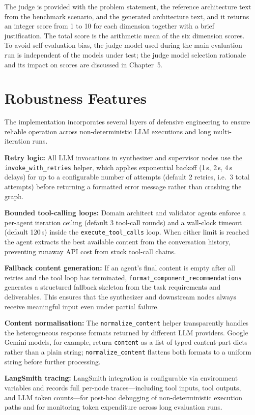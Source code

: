 The judge is provided with the problem statement, the reference architecture text from the benchmark scenario, and the generated architecture text, and it returns an integer score from 1 to 10 for each dimension together with a brief justification. The total score is the arithmetic mean of the six dimension scores. To avoid self-evaluation bias, the judge model used during the main evaluation run is independent of the models under test; the judge model selection rationale and its impact on scores are discussed in Chapter~5.

\section{Robustness Features}

The implementation incorporates several layers of defensive engineering to ensure reliable operation across non-deterministic LLM executions and long multi-iteration runs.

\textbf{Retry logic:} All LLM invocations in synthesizer and supervisor nodes use the \texttt{invoke\_with\_retries} helper, which applies exponential backoff (1\,s, 2\,s, 4\,s delays) for up to a configurable number of attempts (default 2 retries, i.e.\ 3 total attempts) before returning a formatted error message rather than crashing the graph.

\textbf{Bounded tool-calling loops:} Domain architect and validator agents enforce a per-agent iteration ceiling (default 3 tool-call rounds) and a wall-clock timeout (default 120\,s) inside the \texttt{execute\_tool\_calls} loop. When either limit is reached the agent extracts the best available content from the conversation history, preventing runaway API cost from stuck tool-call chains.

\textbf{Fallback content generation:} If an agent's final content is empty after all retries and the tool loop has terminated, \texttt{format\_component\_recommendations} generates a structured fallback skeleton from the task requirements and deliverables. This ensures that the synthesizer and downstream nodes always receive meaningful input even under partial failure.

\textbf{Content normalisation:} The \texttt{normalize\_content} helper transparently handles the heterogeneous response formats returned by different LLM providers. Google Gemini models, for example, return \texttt{content} as a list of typed content-part dicts rather than a plain string; \texttt{normalize\_content} flattens both formats to a uniform string before further processing.

\textbf{LangSmith tracing:} LangSmith integration is configurable via environment variables and records full per-node traces---including tool inputs, tool outputs, and LLM token counts---for post-hoc debugging of non-deterministic execution paths and for monitoring token expenditure across long evaluation runs.